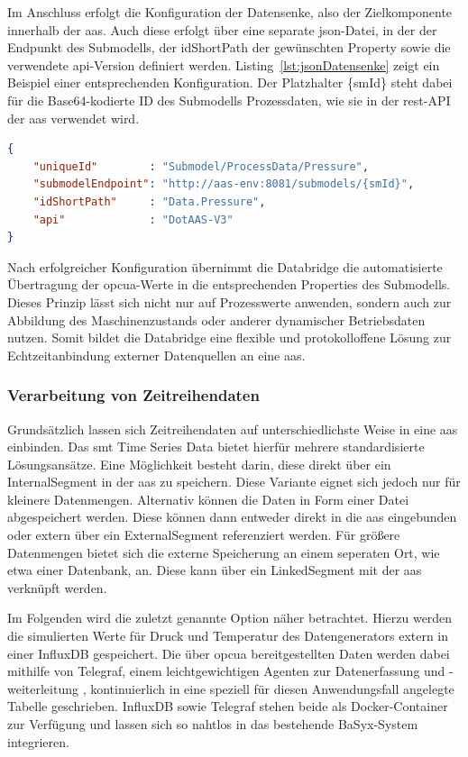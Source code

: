 Im Anschluss erfolgt die Konfiguration der Datensenke, also der Zielkomponente innerhalb der \acs{aas}.
Auch diese erfolgt über eine separate \acs{json}-Datei, in der der Endpunkt des Submodells, der idShortPath der gewünschten Property sowie die verwendete \acs{api}-Version definiert werden.
Listing~\ref{lst:jsonDatensenke} zeigt ein Beispiel einer entsprechenden Konfiguration.
Der Platzhalter \{smId\} steht dabei für die Base64-kodierte ID des Submodells Prozessdaten, wie sie in der \acs{rest}-API der \acs{aas} verwendet wird.

\begin{lstlisting}[language=json, caption={Beispielhafte \acs{json}-Konfiguration einer Datensenke}, label={lst:jsonDatensenke}]
{
    "uniqueId"        : "Submodel/ProcessData/Pressure",
    "submodelEndpoint": "http://aas-env:8081/submodels/{smId}",
    "idShortPath"     : "Data.Pressure",
    "api"             : "DotAAS-V3"
}
\end{lstlisting}

Nach erfolgreicher Konfiguration übernimmt die Databridge die automatisierte Übertragung der \acs{opcua}-Werte in die entsprechenden Properties des Submodells.
Dieses Prinzip lässt sich nicht nur auf Prozesswerte anwenden, sondern auch zur Abbildung des Maschinenzustands oder anderer dynamischer Betriebsdaten nutzen.
Somit bildet die Databridge eine flexible und protokolloffene Lösung zur Echtzeitanbindung externer Datenquellen an eine \acs{aas}.


\subsubsection{Verarbeitung von Zeitreihendaten}
\label{sec: VerarbeitungZeitreihen}
Grundsätzlich lassen sich Zeitreihendaten auf unterschiedlichste Weise in eine \acs{aas} einbinden.
Das \acs{smt} Time Series Data \cite{SpezifikationTimeSeriesData} bietet hierfür mehrere standardisierte Lösungsansätze.
Eine Möglichkeit besteht darin, diese direkt über ein InternalSegment in der \acs{aas} zu speichern.
Diese Variante eignet sich jedoch nur für kleinere Datenmengen.
Alternativ können die Daten in Form einer Datei abgespeichert werden.
Diese können dann entweder direkt in die \acs{aas} eingebunden oder extern über ein ExternalSegment referenziert werden.
Für größere Datenmengen bietet sich die externe Speicherung an einem seperaten Ort, wie etwa einer Datenbank, an.
Diese kann über ein LinkedSegment mit der \acs{aas} verknüpft werden.

Im Folgenden wird die zuletzt genannte Option näher betrachtet.
Hierzu werden die simulierten Werte für Druck und Temperatur des Datengenerators extern in einer InfluxDB gespeichert.
Die über \acs{opcua} bereitgestellten Daten werden dabei mithilfe von Telegraf, einem leichtgewichtigen Agenten zur Datenerfassung und -weiterleitung \cite{Influx}, kontinuierlich in eine speziell für diesen Anwendungsfall angelegte Tabelle geschrieben.
InfluxDB sowie Telegraf stehen beide als Docker-Container zur Verfügung und lassen sich so nahtlos in das bestehende BaSyx-System integrieren.

